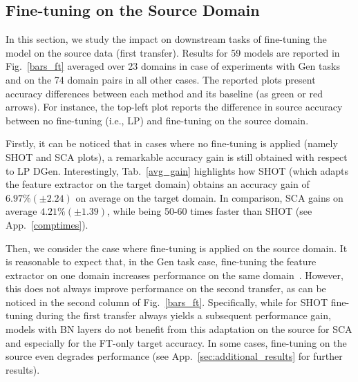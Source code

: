 \documentclass{article}
\begin{document}
\subsection{Fine-tuning on the Source Domain}
\label{ft_sec}

In this section, we study the impact on downstream tasks of fine-tuning the model on the source data (first transfer). 
Results for 59 models are reported in Fig.~\ref{bars_ft} averaged over 23 domains in case of experiments with 
Gen tasks and on the 74 domain pairs in all other cases. 
The reported plots present accuracy differences between each method and its baseline (as green or red arrows). 
For instance, 
the top-left plot
reports the difference in source accuracy between no fine-tuning (i.e., LP) and fine-tuning on the source domain.

Firstly, it can be noticed that in cases where no fine-tuning is applied (namely SHOT and SCA plots), a remarkable accuracy gain is still obtained with respect to LP DGen. Interestingly, Tab.~\ref{avg_gain} highlights how SHOT (which adapts the feature extractor on the target domain) obtains an accuracy gain of $6.97 \% (\pm 2.24)$ on average on the target domain. In comparison, SCA gains on average $4.21 \% (\pm 1.39)$, while being 50-60 times faster than SHOT (see App.~\ref{comptimes}).

Then, we consider the case where fine-tuning is applied on the source domain. It is reasonable to expect that, in the Gen task case, fine-tuning the feature extractor on one domain increases performance on the same domain~\citep{kornblith2019better}. 
However, this does not always improve performance on the second transfer, as can be noticed 
in the second column of Fig.~\ref{bars_ft}. 
Specifically, while for SHOT fine-tuning during the first transfer always 
yields a
subsequent performance gain, models with BN layers do not benefit from this adaptation on the source for SCA and especially for the FT-only target accuracy. 
In some cases, fine-tuning on the source even degrades performance (see App.~\ref{sec:additional_results} for further results).
\end{document}
